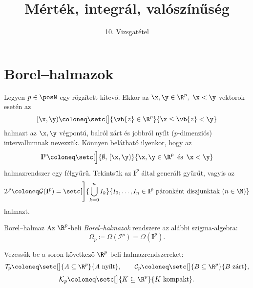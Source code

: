 \documentclass[
]{elteikthesis}[2024/04/26]
\title{Mérték, integrál, valószínűség} %
\subtitle{10. Vizsgatétel}
\begin{document}
	
	
	\section{Borel--halmazok}
	
	Legyen \( p \in \posN \) egy rögzített kitevő. 
	Ekkor az \( \x, \y \in \R^p, \ \x < \y \) vektorok esetén az
	\[
		[\x, \y) \coloneq 
		\setc[\big]{ \vb{z} \in \R^p }{ \x \leq \vb{z} < \y }
	\]
	halmazt az \( \x, \y \) végpontú, balról zárt és jobbról nyílt (\( p \)-dimenziós) intervallumnak nevezzük. Könnyen belátható ilyenkor, hogy az
	\[
		\mathbf{I}^p \coloneq 
		\setc[\Big]{ \emptyset,\, [\x, \y) }{ \x, \y \in \R^p \,\text{ és }\, \x < \y }
	\]
	halmazrendszer egy félgyűrű. Tekintsük az \( \mathbf{I}^p \) által generált gyűrűt, vagyis az
	\[
		\mathcal{I}^p \coloneq 
		\mathcal{G}( \mathbf{I}^p ) =
		\setc[\Bigg]{ \bigcup_{k=0}^n I_k }
		{ I_0, \dots, I_n \in \mathbf{I}^p \text{ páronként diszjunktak } (n \in \N) }
	\]
	halmazt.
	
	\begin{definition}{Borel--halmaz}{}
		Az \( \R^p \)-beli \emph{Borel--halmazok} rendszere az alábbi szigma-algebra:
		\[
			\Omega_p \coloneq \Omega( \mathcal{I}^p ) = \Omega( \mathbf{I}^p ).
		\]
	\end{definition}
	
	Vezessük be a soron következő \( \R^p \)-beli halmazrendszereket:
	\[
		\mathcal{T}_p \coloneq \setc[\big]{ A \subseteq \R^p }{ A \text{ nyílt} }, \qquad
		\mathcal{C}_p \coloneq \setc[\big]{ B \subseteq \R^p }{ B \text{ zárt} },
	\]
	\[
		\mathcal{K}_p \coloneq \setc[\big]{ K \subseteq \R^p }{ K \text{ kompakt} }.
	\]
	
\end{document}
